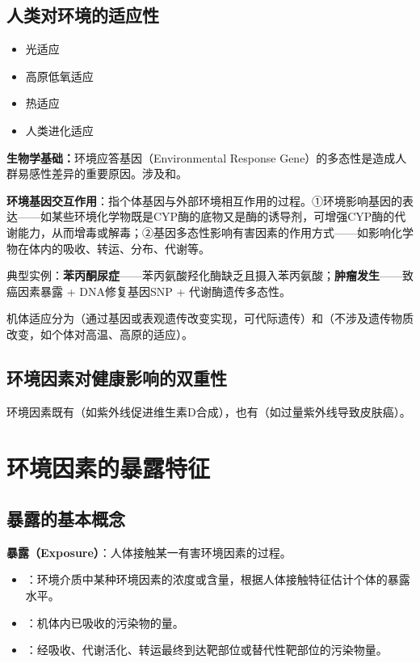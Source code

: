 \documentclass[10pt,a4paper,oneside]{ctexbook}
\begin{document}
\subsection{人类对环境的适应性}
\begin{itemize}[leftmargin=*]
    \item 光适应
    \item 高原低氧适应
    \item 热适应
    \item 人类进化适应
\end{itemize}

\textbf{生物学基础：}环境应答基因（Environmental Response Gene）的多态性是造成人群易感性差异的重要原因。涉及和。

\begin{defbox}
\textbf{环境基因交互作用}：指个体基因与外部环境相互作用的过程。①环境影响基因的表达——如某些环境化学物既是CYP酶的底物又是酶的诱导剂，可增强CYP酶的代谢能力，从而增毒或解毒；②基因多态性影响有害因素的作用方式——如影响化学物在体内的吸收、转运、分布、代谢等。

典型实例：\textbf{苯丙酮尿症}——苯丙氨酸羟化酶缺乏且摄入苯丙氨酸；\textbf{肿瘤发生}——致癌因素暴露 + DNA修复基因SNP + 代谢酶遗传多态性。

机体适应分为（通过基因或表观遗传改变实现，可代际遗传）和（不涉及遗传物质改变，如个体对高温、高原的适应）。
\end{defbox}

\subsection{环境因素对健康影响的双重性}
环境因素既有（如紫外线促进维生素D合成），也有（如过量紫外线导致皮肤癌）。

\section{环境因素的暴露特征}

\subsection{暴露的基本概念}

\begin{defbox}
\textbf{暴露（Exposure）}：人体接触某一有害环境因素的过程。
\end{defbox}

\begin{itemize}[leftmargin=*]
    \item {}：环境介质中某种环境因素的浓度或含量，根据人体接触特征估计个体的暴露水平。
    \item {}：机体内已吸收的污染物的量。
    \item {}：经吸收、代谢活化、转运最终到达靶部位或替代性靶部位的污染物量。
\end{itemize}
\end{document}
